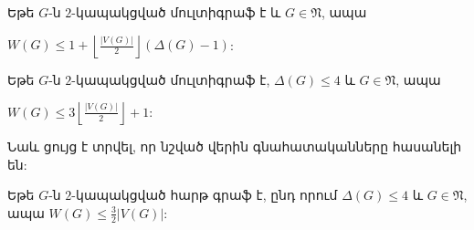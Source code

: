 \begin{corollary}
\label{c1_upper_V/2} Եթե $G$-ն $2$-կապակցված մուլտիգրաֆ է և $G\in \mathfrak{N}$, ապա
\begin{center}
$W(G)\leq 1+\left\lfloor \frac{\vert
V(G)\vert}{2}\right\rfloor(\Delta(G)-1)$:
\end{center}
\end{corollary}
\begin{hide}
\begin{corollary}
\label{c1_upper_Delta4} Եթե $G$-ն $2$-կապակցված մուլտիգրաֆ է,
$\Delta(G)\leq 4$ և $G\in \mathfrak{N}$, ապա
\begin{center}
$W(G)\leq 3\left\lfloor \frac{\vert V(G)\vert}{2}\right\rfloor+1$:
\end{center}
\end{corollary}
\end{hide}
Նաև ցույց է տրվել, որ նշված վերին գնահատականները հասանելի են:
\begin{corollary}
\label{c1_upper_Delta4_planar} Եթե $G$-ն $2$-կապակցված հարթ գրաֆ է, ընդ որում
$\Delta(G)\leq 4$ և $G\in \mathfrak{N}$, ապա
$W(G)\leq \frac{3}{2}\vert V(G)\vert$:
\end{corollary}
